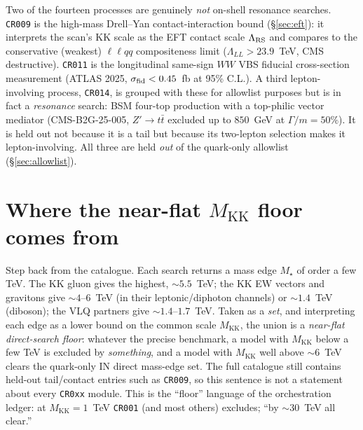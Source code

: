 \documentclass[11pt]{article}
\newcommand{\MKK}{M_{\mathrm{KK}}}
\newcommand{\code}[1]{\texttt{#1}}
\theoremstyle{definition}
\begin{document}
Two of the fourteen processes are genuinely \emph{not} on-shell resonance
searches. \code{CR009} is the high-mass Drell--Yan contact-interaction bound
(\S\ref{sec:eft}): it interprets the scan's KK scale as the EFT contact scale
$\Lambda_{\rm RS}$ and compares to the conservative (weakest) $\ell\ell qq$
compositeness limit ($\Lambda_{LL} > 23.9$~TeV, CMS destructive). \code{CR011}
is the longitudinal same-sign $WW$ VBS fiducial cross-section measurement (ATLAS
2025, $\sigma_{\rm fid} < 0.45$~fb at 95\% C.L.). A third lepton-involving
process, \code{CR014}, is grouped with these for allowlist purposes but is in
fact a \emph{resonance} search: BSM four-top production with a top-philic vector
mediator (CMS-B2G-25-005, $Z'\to t\bar t$ excluded up to $850$~GeV at
$\Gamma/m = 50\%$). It is held out not because it is a tail but because its
two-lepton selection makes it lepton-involving. All three are held \emph{out} of
the quark-only allowlist (\S\ref{sec:allowlist}).

\section{Where the near-flat \texorpdfstring{$\MKK$}{M\_KK} floor comes from}
\label{sec:floor}

Step back from the catalogue. Each search returns a mass edge $M_\star$ of order
a few TeV. The KK gluon gives the highest, $\sim 5.5$~TeV; the KK EW vectors and
gravitons give $\sim 4$--$6$~TeV (in their leptonic/diphoton channels) or
$\sim 1.4$~TeV (diboson); the VLQ partners give $\sim 1.4$--$1.7$~TeV. Taken as a
\emph{set}, and interpreting each edge as a lower bound on the common scale
$\MKK$, the union is a \emph{near-flat direct-search floor}: whatever the precise
benchmark, a model with $\MKK$ below a few TeV is excluded by \emph{something},
and a model with $\MKK$ well above $\sim 6$~TeV clears the quark-only IN
direct mass-edge set. The full catalogue still contains held-out tail/contact
entries such as \code{CR009}, so this sentence is not a statement about every
\code{CR0xx} module. This is the
``floor'' language of the orchestration ledger: at $\MKK = 1$~TeV \code{CR001}
(and most others) excludes; ``by $\sim 30$~TeV all clear.''
\end{document}
